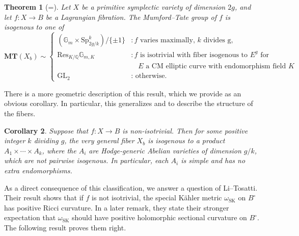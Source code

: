 \documentclass[12pt]{amsart}
\newcommand{\Q}{\mathbb{Q}}
\newcommand{\Sp}{\mathrm{Sp}}
\newcommand{\GL}{\mathrm{GL}}
\newtheorem{theorem}{Theorem}[section]
\newtheorem{corollary}[theorem]{Corollary}
\theoremstyle{definition}
\numberwithin{equation}{section}
\begin{document}
\begin{theorem}[=] 
    Let \(X\) be a primitive symplectic variety of dimension \(2g\), and let 
    \(f: X \to B\) be a Lagrangian fibration. The Mumford--Tate group of 
    \(f\) is isogenous to one of 
    \begin{equation*}
        \mathbf{MT}(X_b) \sim \begin{cases}
            (\mathbb{G}_m \times \Sp_{2g/k}^k) / \{\pm 1\} & : f \text{ varies maximally, } 
            k \text{ divides g,}\\
            \mathrm{Res}_{K/\Q} \mathbb{G}_{m, K} & : 
            f \text{ is isotrivial with fiber isogenous to } E^g \text{ for } \\
            & \quad  E \text{ a CM elliptic curve with endomorphism field } K\\
            \GL_2 & : \text{ otherwise.}
        \end{cases}
    \end{equation*}
\end{theorem}

There is a more geometric description of this result, which we provide as an 
obvious corollary. In particular, this generalizes \cite{matsushita99} and 
\cite{campana06} to describe the structure of the fibers. 

\begin{corollary}
    Suppose that \(f: X \to B\) is non-isotrivial. Then for some positive integer 
    \(k\) dividing \(g\), the very general fiber \(X_b\) is isogenous to a product 
    \(A_1 \times \cdots \times A_k\), where the \(A_i\) are Hodge-generic Abelian 
    varieties of dimension \(g/k\), which are not pairwise isogenous. 
    In particular, each \(A_i\) is simple and has no extra endomorphisms.
\end{corollary}

As a direct consequence of this classification, we answer a question of 
Li--Tosatti. Their result \cite[Corollary 2.2]{li-tosatti24} shows that 
if \(f\) is not isotrivial, the special K\"ahler metric \(\omega_\mathrm{SK}\) on 
\(B^\circ\) has positive Ricci curvature. In a later remark, they state their stronger
expectation that \(\omega_\mathrm{SK}\) should have positive holomorphic sectional 
curvature on \(B^\circ\). The following result proves them right.
\end{document}
